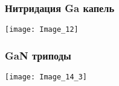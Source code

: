 \begin{frame}
	\frametitle{Нитридация Ga капель}
	\centering
	\texttt{[image: Image\_12]} \\
	\vfill
	\begin{minipage}[t]{0.4\linewidth}
	\end{minipage}
	\begin{minipage}[t]{0.4\linewidth}
	\end{minipage}
\end{frame}

\begin{frame}
	\frametitle{GaN триподы}
	\centering
	\begin{minipage}[t]{0.2\linewidth}
	\end{minipage}
	\begin{minipage}[t]{0.2\linewidth}
	\end{minipage}
	\begin{minipage}[t]{0.2\linewidth}
	\end{minipage}
	\begin{minipage}[t]{0.2\linewidth}
	\end{minipage}
	\bigskip
	\texttt{[image: Image\_14\_3]}
\end{frame}

